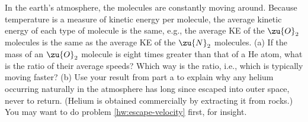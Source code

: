 In the earth's atmosphere, the molecules are constantly
moving around. Because temperature is a measure of kinetic
energy per molecule, the average kinetic energy of each type
of molecule is the same, e.g., the average KE of the $\zu{O}_2$
molecules is the same as the average KE of the $\zu{N}_2$
molecules. (a) If the mass of an $\zu{O}_2$ molecule is eight
times greater than that of a He atom, what is the ratio of
their average speeds? Which way is the ratio, i.e., which is
typically moving faster? (b) Use your result from part a to
explain why any helium occurring naturally in the atmosphere
has long since escaped into outer space, never to return.
(Helium is obtained commercially by extracting it from rocks.)
You may want to do problem \ref{hw:escape-velocity} first,
for insight.\answercheck
